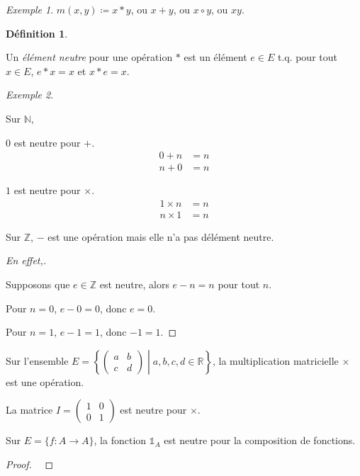 \documentclass{report}
\newcommand*{\reels}{\mathbb{R}}
\newcommand*{\entiers}{\mathbb{Z}}
\newcommand*{\naturels}{\mathbb{N}}
\newcommand*{\identite}{\mathds{1}}
\theoremstyle{definition}
\newtheorem*{defin}{D\'efinition}
\theoremstyle{remark}
\newtheorem*{exem}{Exemple}
\begin{document}
	\begin{exem}
		$m(x,y) \coloneq x*y$, ou $x+y$, ou $x \circ y$, ou $xy$.
	\end{exem}

	\begin{defin}~

		Un \emph{\'el\'ement neutre} pour une op\'eration $*$ est un \'el\'ement $e \in E$ t.q. pour tout $x \in E$, $e*x=x$ et $x*e=x$.
	\end{defin}

	\begin{exem}~

		Sur $\naturels$,

		\begin{ulist}
			\item $0$ est neutre pour $+$.
			\begin{align*}
				0+n&=n\\
				n+0&=n
			\end{align*}
			\item $1$ est neutre pour $\times$.
			\begin{align*}
				1 \times n&=n\\
				n \times 1&=n
			\end{align*}
		\end{ulist}

		Sur $\entiers$, $-$ est une op\'eration mais elle n'a pas d\'el\'ement neutre.
		\renewcommand{\qedsymbol}{\lightning}
		\begin{proof}[En effet,]~

			Supposons que $e \in \entiers$ est neutre, alors $e-n=n$ pour tout $n$.

			Pour $n=0$, $e-0=0$, donc $e=0$.

			Pour $n=1$, $e-1=1$, donc $-1=1$.
		\end{proof}
		\renewcommand{\qedsymbol}{$\square$}
		\begin{ulist}
			\item Sur l'ensemble $E=\left\lbrace \left( \begin{array}{cc}
				a&b\\c&d
			\end{array}\right) \middle| a,b,c,d \in \reels\right\rbrace$, la multiplication matricielle $\times$ est une op\'eration.

			La matrice $I=\left( \begin{array}{cc}
				1&0\\0&1
			\end{array}\right)$ est neutre pour $\times$.
			\item Sur $E=\{f:A \to A\}$, la fonction $\identite_A$ est neutre pour la composition de fonctions.
			\begin{proof}~


\end{proof}
\end{ulist}
\end{exem}
\end{document}
